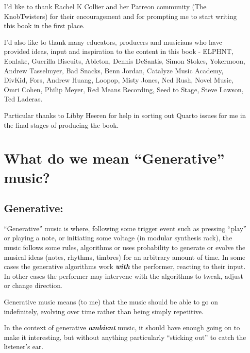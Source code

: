 \documentclass[
  12pt,
  letterpaper,
  oneside,
  open=any]{scrbook}
\begin{document}

I'd like to thank Rachel K Collier and her Patreon community (The
KnobTwisters) for their encouragement and for prompting me to start
writing this book in the first place.

I'd also like to thank many educators, producers and musicians who have
provided ideas, input and inspiration to the content in this book -
ELPHNT, Eonlake, Guerilla Biscuits, Ableton, Dennis DeSantis, Simon
Stokes, Yokermoon, Andrew Tasselmyer, Bad Snacks, Benn Jordan, Catalyze
Music Academy, DivKid, Fors, Andrew Huang, Loopop, Misty Jones, Ned
Rush, Novel Music, Omri Cohen, Philip Meyer, Red Means Recording, Seed
to Stage, Steve Lawson, Ted Laderas.

Particular thanks to Libby Heeren for help in sorting out Quarto issues
for me in the final stages of producing the book.


\chapter{What do we mean ``Generative''
music?}\label{0000-Defintion-Generative}

\section*{Generative:}\label{generative}


``Generative'' music is where, following some trigger event such as
pressing ``play'' or playing a note, or initiating some voltage (in
modular synthesis rack), the music follows some rules, algorithms or
uses probability to generate or evolve the musical ideas (notes,
rhythms, timbres) for an arbitrary amount of time. In some cases the
generative algorithms work \textbf{\emph{with}} the performer, reacting
to their input. In other cases the performer may intervene with the
algorithms to tweak, adjust or change direction.

\begin{tcolorbox}[enhanced jigsaw, arc=.35mm, title=\textcolor{quarto-callout-tip-color}{\faLightbulb}\hspace{0.5em}{Key idea}, colback=white, opacitybacktitle=0.6, coltitle=black, toptitle=1mm, colframe=quarto-callout-tip-color-frame, bottomtitle=1mm, titlerule=0mm, rightrule=.15mm, bottomrule=.15mm, colbacktitle=quarto-callout-tip-color!10!white, toprule=.15mm, breakable, opacityback=0, left=2mm, leftrule=.75mm]

Generative music means (to me) that the music should be able to go on
indefinitely, evolving over time rather than being simply repetitive.

In the context of generative \textbf{\emph{ambient}} music, it should
have enough going on to make it interesting, but without anything
particularly ``sticking out'' to catch the listener's ear.

\end{tcolorbox}
\end{document}
